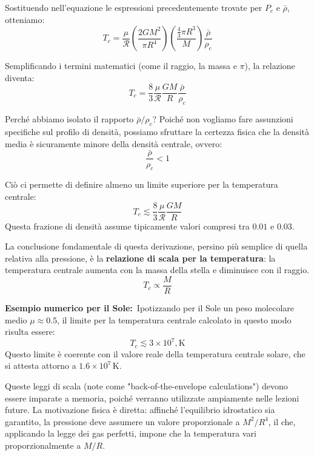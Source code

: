 Sostituendo nell'equazione le espressioni precedentemente trovate per $P_c$ e $\bar{\rho}$, otteniamo:
\begin{equation}
T_c = \frac{\mu}{\mathcal{R}} \left( \frac{2 G M^2}{\pi R^4} \right) \left( \frac{\frac{4}{3}\pi R^3}{M} \right) \frac{\bar{\rho}}{\rho_c}
\end{equation}

Semplificando i termini matematici (come il raggio, la massa e $\pi$), la relazione diventa:
\begin{equation}
T_c = \frac{8}{3} \frac{\mu}{\mathcal{R}} \frac{G M}{R} \frac{\bar{\rho}}{\rho_c}
\end{equation}

Perché abbiamo isolato il rapporto $\bar{\rho} / \rho_c$? Poiché non vogliamo fare assunzioni specifiche sul profilo di densità, possiamo sfruttare la certezza fisica che la densità media è sicuramente minore della densità centrale, ovvero:
\begin{equation}
\frac{\bar{\rho}}{\rho_c} < 1
\end{equation}

Ciò ci permette di definire almeno un limite superiore per la temperatura centrale:
\begin{equation}
T_c \lesssim \frac{8}{3} \frac{\mu}{\mathcal{R}} \frac{G M}{R}
\end{equation}
Questa frazione di densità assume tipicamente valori compresi tra $0.01$ e $0.03$.

La conclusione fondamentale di questa derivazione, persino più semplice di quella relativa alla pressione, è la \textbf{relazione di scala per la temperatura}: la temperatura centrale aumenta con la massa della stella e diminuisce con il raggio.
\begin{equation}
T_c \propto \frac{M}{R}
\end{equation}

\textbf{Esempio numerico per il Sole:}\
Ipotizzando per il Sole un peso molecolare medio $\mu \approx 0.5$, il limite per la temperatura centrale calcolato in questo modo risulta essere:
\begin{equation}
T_c \lesssim 3 \times 10^7 , \text{K}
\end{equation}
Questo limite è coerente con il valore reale della temperatura centrale solare, che si attesta attorno a $1.6 \times 10^7 \, \text{K}$.

Queste leggi di scala (note come "back-of-the-envelope calculations") devono essere imparate a memoria, poiché verranno utilizzate ampiamente nelle lezioni future. La motivazione fisica è diretta: affinché l'equilibrio idrostatico sia garantito, la pressione deve assumere un valore proporzionale a $M^2/R^4$, il che, applicando la legge dei gas perfetti, impone che la temperatura vari proporzionalmente a $M/R$.

